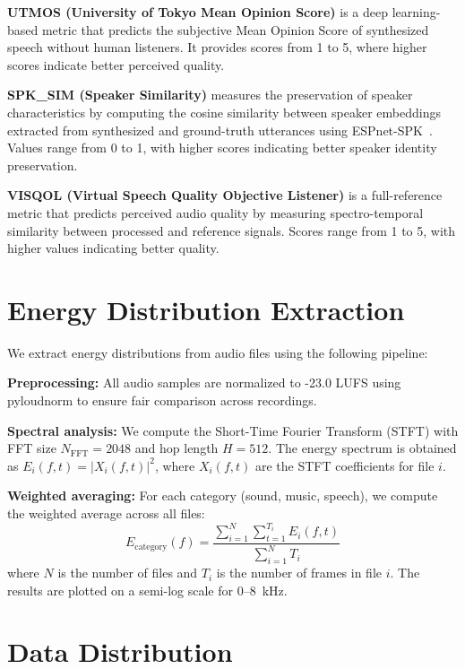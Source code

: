 \documentclass[11pt]{article}
\begin{document}
\noindent\textbf{UTMOS (University of Tokyo Mean Opinion Score)} is a deep learning-based metric that predicts the subjective Mean Opinion Score of synthesized speech without human listeners. It provides scores from 1 to 5, where higher scores indicate better perceived quality.

\noindent\textbf{SPK\_SIM (Speaker Similarity)} measures the preservation of speaker characteristics by computing the cosine similarity between speaker embeddings extracted from synthesized and ground-truth utterances using ESPnet-SPK~\cite{jung2024espnet}. Values range from 0 to 1, with higher scores indicating better speaker identity preservation.

\noindent\textbf{VISQOL (Virtual Speech Quality Objective Listener)} is a full-reference metric that predicts perceived audio quality by measuring spectro-temporal similarity between processed and reference signals. Scores range from 1 to 5, with higher values indicating better quality.


\section{Energy Distribution Extraction}
\label{app:energy_extraction}

We extract energy distributions from audio files using the following pipeline:

\noindent\textbf{Preprocessing:} All audio samples are normalized to -23.0 LUFS using pyloudnorm to ensure fair comparison across recordings.

\noindent\textbf{Spectral analysis:} We compute the Short-Time Fourier Transform (STFT) with FFT size $N_{\text{FFT}} = 2048$ and hop length $H = 512$. The energy spectrum is obtained as $E_i(f, t) = |X_i(f, t)|^2$, where $X_i(f, t)$ are the STFT coefficients for file $i$.

\noindent\textbf{Weighted averaging:} For each category (sound, music, speech), we compute the weighted average across all files:
\begin{equation}
    E_{\text{category}}(f) = \frac{\sum_{i=1}^{N} \sum_{t=1}^{T_i} E_i(f, t)}{\sum_{i=1}^{N} T_i}
\end{equation}
where $N$ is the number of files and $T_i$ is the number of frames in file $i$.
The results are plotted on a semi-log scale for 0--8~kHz.


\section{Data Distribution}
\label{app:4}
\end{document}
